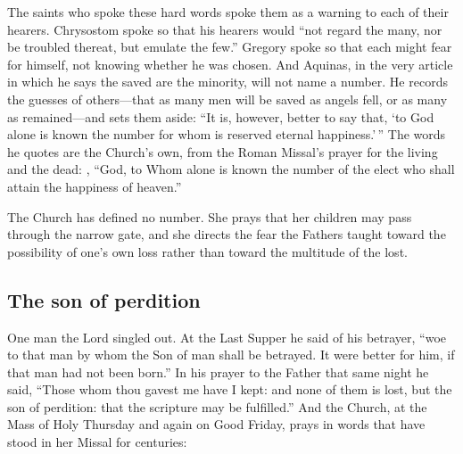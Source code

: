 The saints who spoke these hard words spoke them as a warning to each of their hearers. Chrysostom spoke so that his hearers would ``not regard the many, nor be troubled thereat, but emulate the few.'' Gregory spoke so that each might fear for himself, not knowing whether he was chosen. And Aquinas, in the very article in which he says the saved are the minority, will not name a number. He records the guesses of others---that as many men will be saved as angels fell, or as many as remained---and sets them aside: ``It is, however, better to say that, `to God alone is known the number for whom is reserved eternal happiness.'\,'' The words he quotes are the Church's own, from the Roman Missal's prayer for the living and the dead: , ``God, to Whom alone is known the number of the elect who shall attain the happiness of heaven.''

The Church has defined no number. She prays that her children may pass through the narrow gate, and she directs the fear the Fathers taught toward the possibility of one's own loss rather than toward the multitude of the lost.

\subsection{The son of perdition}

One man the Lord singled out. At the Last Supper he said of his betrayer, ``woe to that man by whom the Son of man shall be betrayed. It were better for him, if that man had not been born.'' In his prayer to the Father that same night he said, ``Those whom thou gavest me have I kept: and none of them is lost, but the son of perdition: that the scripture may be fulfilled.'' And the Church, at the Mass of Holy Thursday and again on Good Friday, prays in words that have stood in her Missal for centuries:

